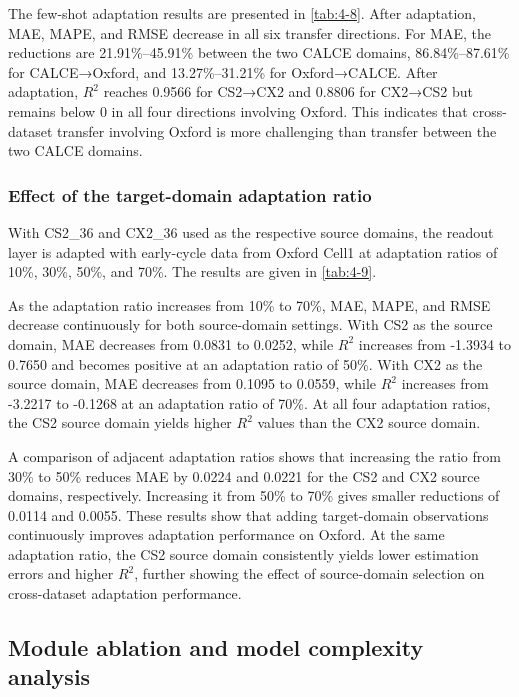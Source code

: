 The few-shot adaptation results are presented in \cref{tab:4-8}. After adaptation, MAE, MAPE, and RMSE decrease in all six transfer directions. For MAE, the reductions are 21.91\%–45.91\% between the two CALCE domains, 86.84\%–87.61\% for CALCE→Oxford, and 13.27\%–31.21\% for Oxford→CALCE. After adaptation, $R^2$ reaches 0.9566 for CS2→CX2 and 0.8806 for CX2→CS2 but remains below 0 in all four directions involving Oxford. This indicates that cross-dataset transfer involving Oxford is more challenging than transfer between the two CALCE domains.



\FloatBarrier

\subsubsection{Effect of the target-domain adaptation ratio}

With CS2\_36 and CX2\_36 used as the respective source domains, the readout layer is adapted with early-cycle data from Oxford Cell1 at adaptation ratios of 10\%, 30\%, 50\%, and 70\%. The results are given in \cref{tab:4-9}.


As the adaptation ratio increases from 10\% to 70\%, MAE, MAPE, and RMSE decrease continuously for both source-domain settings. With CS2 as the source domain, MAE decreases from 0.0831 to 0.0252, while $R^2$ increases from -1.3934 to 0.7650 and becomes positive at an adaptation ratio of 50\%. With CX2 as the source domain, MAE decreases from 0.1095 to 0.0559, while $R^2$ increases from -3.2217 to -0.1268 at an adaptation ratio of 70\%. At all four adaptation ratios, the CS2 source domain yields higher $R^2$ values than the CX2 source domain.

A comparison of adjacent adaptation ratios shows that increasing the ratio from 30\% to 50\% reduces MAE by 0.0224 and 0.0221 for the CS2 and CX2 source domains, respectively. Increasing it from 50\% to 70\% gives smaller reductions of 0.0114 and 0.0055. These results show that adding target-domain observations continuously improves adaptation performance on Oxford. At the same adaptation ratio, the CS2 source domain consistently yields lower estimation errors and higher $R^2$, further showing the effect of source-domain selection on cross-dataset adaptation performance.


\FloatBarrier


\subsection{Module ablation and model complexity analysis}

